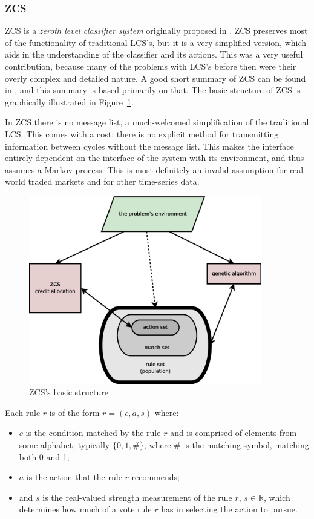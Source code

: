 \subsubsection{ZCS}
ZCS is a \emph{zeroth level classifier system} originally proposed in \cite{WilsonZCS}.
ZCS preserves most of the functionality of traditional LCS's, but it is a very simplified version, which aids in the understanding of the classifier and its actions.
This was a very useful contribution, because many of the problems with LCS's before then were their overly complex and detailed nature.
A good short summary of ZCS can be found in
\cite{EibenSmith}, and this summary is based primarily on that.
The basic structure of ZCS is graphically illustrated in Figure~\ref{fig:zcs}.

In ZCS there is no message list, a much-welcomed simplification of the traditional LCS.
This comes with a cost: there is no explicit method for transmitting information between cycles without the message list.
This makes the interface entirely dependent on the interface of the system with its environment, and thus assumes a Markov process.
This is most definitely an invalid assumption for real-world traded markets and for other time-series data.

\begin{figure}
\begin{center}
\includegraphics[width=4in]{zcs-basic-diagram.eps}
\caption{ZCS's basic structure}
\label{fig:zcs}
\end{center}
\end{figure}

Each rule $r$ is of the form $r = (c, a, s)$ where:
\begin{itemize}
\item
$c$ is the condition matched by the rule $r$ and is comprised of elements from some alphabet, typically $\{0, 1, \#\}$,
where \# is the matching symbol, matching both 0 and 1;
\item
$a$ is the action that the rule $r$ recommends;
\item
and $s$ is the real-valued strength measurement of the rule $r$, $s \in \mathbb{R}$, which determines how much of a vote rule $r$ has in selecting the action to pursue.
\end{itemize}

